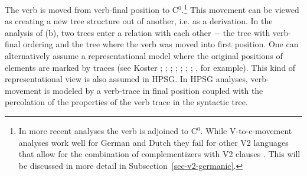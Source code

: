{The verb is moved from verb-final position to C$^0$.\footnote{%
  In more recent analyses the verb is adjoined to C$^0$. While V-to-c-movement analyses work well for German and
  Dutch they fail for other V2 languages that allow for the combination of complementizers
  with V2 clauses \citep{Fanselow2009b}. This will be discussed in more detail in
  Subsection~\ref{sec-v2-germanic}.
} This movement can be viewed as creating a new tree structure out
of another, i.e. as a derivation. In the analysis of (b), two trees enter a relation with each other $-$ the
tree with verb-final ordering and the tree where the verb was moved into first position. One can alternatively assume a 
representational model where the original positions of elements are marked by traces (see %
Koster \citeyear[\page ]{Koster78b-u}; \citeyear[]{Koster87a-u}; 
\citealp{KT91a}; \citealp[Section~1.4]{Haider93a}; 
\citealp[]{Frey93a}; \citealp[--88, 177--178]{Lohnstein93a-u}; \citealp[]{FC94a}; \citealp[]{Veenstra98a}, for example). This kind of representational view 
is also assumed in HPSG. In HPSG analyses, verb-movement is modeled by a verb-trace in final position coupled with the percolation of
the properties of the verb trace in the syntactic tree. 

}
